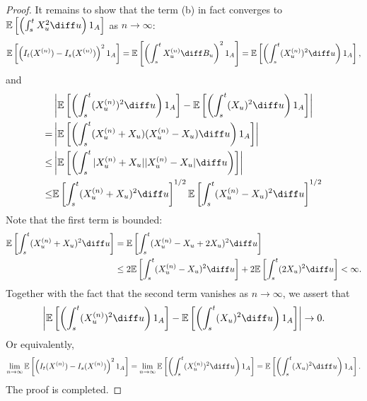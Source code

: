 \begin{proof}
It remains to show that the term (b) in fact converges to $\mathbb{E}\left[
\left(\int_s^tX_u^2\diff u\right)
1_A
\right]$ as $n\to\infty$:
\begin{align*}
\mathbb{E}\left[
\left(
I_t(X^{(n)})-I_s(X^{(n)})
\right)^21_A
\right]=\mathbb{E}\left[
\left(
\int_s^tX_u^{(n)}\diff B_u
\right)^21_A
\right]=\mathbb{E}\left[
\left(
\int_s^t(X_u^{(n)})^2\diff u
\right)1_A
\right],
\end{align*}
and
\begin{align*}
&\left|
\mathbb{E}\left[
\left(
\int_s^t(X_u^{(n)})^2\diff u
\right)1_A
\right]
-
\mathbb{E}\left[
\left(
\int_s^t(X_u)^2\diff u
\right)1_A
\right]
\right|\\
=&\left|
\mathbb{E}\left[
\left(
\int_s^t(X_u^{(n)}+X_u)(X_u^{(n)}-X_u)\diff u
\right)1_A
\right]
\right|\\
\le&\left|
\mathbb{E}\left[
\left(
\int_s^t|X_u^{(n)}+X_u||X_u^{(n)}-X_u|\diff u
\right)
\right]
\right|\\
\le&\mathbb{E}\left[
\int_s^t(X_u^{(n)}+X_u)^2\diff u
\right]^{1/2}\mathbb{E}\left[
\int_s^t(X_u^{(n)}-X_u)^2\diff u
\right]^{1/2}
\end{align*}
Note that the first term is bounded:
\begin{align*}
\mathbb{E}\left[
\int_s^t(X_u^{(n)}+X_u)^2\diff u
\right]&=
\mathbb{E}\left[
\int_s^t(X_u^{(n)}-X_u+2X_u)^2\diff u
\right]\\
&\le 2\mathbb{E}\left[
\int_s^t(X_u^{(n)}-X_u)^2\diff u
\right]+2\mathbb{E}\left[
\int_s^t(2X_u)^2\diff u
\right]<\infty.
\end{align*}
Together with the fact that the second term vanishes as $n\to\infty$, we assert that
\[
\left|
\mathbb{E}\left[
\left(
\int_s^t(X_u^{(n)})^2\diff u
\right)1_A
\right]
-
\mathbb{E}\left[
\left(
\int_s^t(X_u)^2\diff u
\right)1_A
\right]
\right|\to0.
\]
Or equivalently,
\begin{align*}
\lim_{n\to\infty}\mathbb{E}\left[
\left(
I_t(X^{(n)})-I_s(X^{(n)})
\right)^21_A
\right]=\lim_{n\to\infty}\mathbb{E}\left[
\left(
\int_s^t(X_u^{(n)})^2\diff u
\right)1_A
\right]=\mathbb{E}\left[
\left(
\int_s^t(X_u)^2\diff u
\right)1_A
\right].
\end{align*}
The proof is completed.

\end{proof}






















